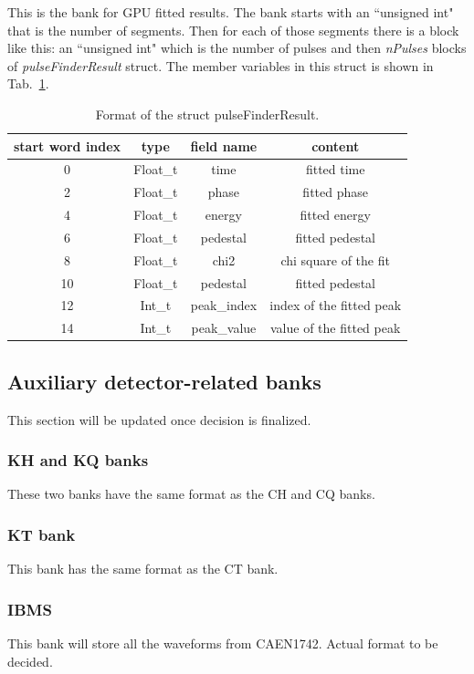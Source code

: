 This is the bank for GPU fitted results. The bank starts with an ``unsigned int" that is the number of segments. Then for each of those segments there is a block like this:
an ``unsigned int" which is the number of pulses and then \textit{nPulses} blocks of \textit{pulseFinderResult} struct. The member variables in this struct is shown in Tab.~\ref{tab:cftable}.

\begin{table}[htbp]
\centering
\caption{Format of the struct pulseFinderResult.}
\begin{tabular}{|c|c|c|c|}
\hline
start word index & type & field name & content  \\
\hline
0	& Float\_t & time & fitted time \\
\hline
2	& Float\_t	& phase & fitted phase \\ 
\hline
4	& Float\_t	& energy	& 	fitted energy \\ 
\hline
6	& Float\_t	& pedestal &  fitted pedestal \\ 
\hline
8	& Float\_t	& chi2 &  chi square of the fit \\ 
\hline
10	& Float\_t	& pedestal &  fitted pedestal \\ 
\hline
12	& Int\_t	& peak\_index &  index of the fitted peak\\ 
\hline
14	& Int\_t	& peak\_value &  value of the fitted peak \\ 
\hline
\end{tabular} 
\label{tab:cftable}
\end{table}

\subsection{Auxiliary detector-related banks}

This section will be updated once decision is finalized.

\subsubsection*{KH and KQ banks}
These two banks have the same format as the CH and CQ banks.

\subsubsection*{KT bank}
This bank has the same format as the CT bank.

\subsubsection*{IBMS}
This bank will store all the waveforms from CAEN1742. Actual format to be decided.

